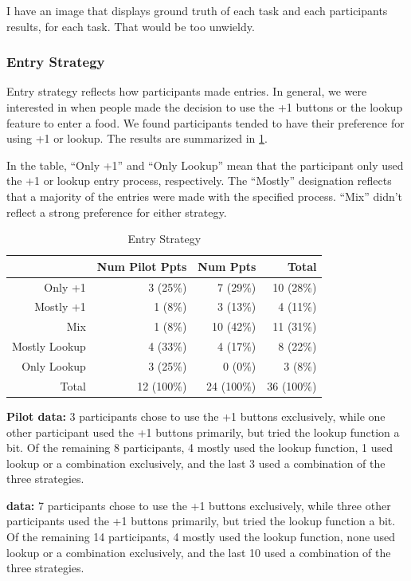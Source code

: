 I have an image that displays ground truth of each task and each participants results, for each task. That would be too unwieldy. 


\subsubsection{Entry Strategy}
Entry strategy reflects how participants made entries. In general, we were interested in when people made the decision to use the +1 buttons or the lookup feature to enter a food. We found participants tended to have their preference for using +1 or lookup. The results are summarized in \ref{tab:inlab_strategy}. 

In the table, ``Only +1'' and ``Only Lookup'' mean that the participant only used the +1 or lookup entry process, respectively. The ``Mostly'' designation reflects that a majority of the entries were made with the specified process. ``Mix'' didn't reflect a strong preference for either strategy. 


\begin{table}[htbp]
\small
  \centering
  \caption{Entry Strategy}
    \begin{tabular}{rrrr}
    \toprule
          & Num Pilot Ppts & Num Ppts & Total \\
    \midrule
    Only +1 & 3 (25\%) & 7 (29\%) & 10 (28\%) \\
    Mostly +1 & 1 (8\%) & 3 (13\%) & 4 (11\%) \\
    Mix   & 1 (8\%) & 10 (42\%) & 11 (31\%) \\
    Mostly Lookup & 4 (33\%) & 4 (17\%) & 8 (22\%) \\
    Only Lookup & 3 (25\%) & 0 (0\%) & 3 (8\%) \\
\midrule
    Total & 12 (100\%) & 24 (100\%) & 36 (100\%) \\
    \bottomrule
    \end{tabular}%
  \label{tab:inlab_strategy}%
\end{table}%


 \textbf{Pilot data:}
3 participants chose to use the +1 buttons exclusively, while one other participant used the +1 buttons primarily, but tried the lookup function a bit. Of the remaining 8 participants, 4 mostly used the lookup function, 1 used lookup or a combination exclusively, and the last 3 used a combination of the three strategies. 

\textbf{data:}
7 participants chose to use the +1 buttons exclusively, while three other participants used the +1 buttons primarily, but tried the lookup function a bit. Of the remaining 14 participants, 4 mostly used the lookup function,  none used lookup or a combination exclusively, and the last 10 used a combination of the three strategies. 


